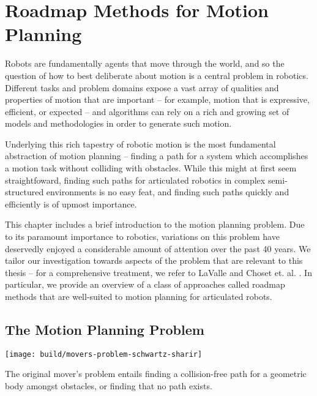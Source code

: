\chapter{Roadmap Methods for Motion Planning}
\label{chap:roadmaps}

Robots are fundamentally agents that move through the world,
and so the question of how to best deliberate about motion
is a central problem in robotics.
Different tasks and problem domains expose a vast array of
qualities and properties of motion that are important
-- for example, motion that is expressive, efficient, or expected
-- and algorithms can rely on a rich and growing set
of models and methodologies in order to generate such motion.

Underlying this rich tapestry of robotic motion
is the most fundamental abstraction of motion planning --
finding a path for a system which accomplishes a motion task
without colliding with obstacles.
While this might at first seem straightfoward,
finding such paths for articulated robotics in
complex semi-structured environments
is no easy feat,
and finding such paths quickly and efficiently
is of upmost importance.

This chapter includes a brief introduction to
the motion planning problem.
Due to its paramount importance to robotics,
variations on this problem have deservedly
enjoyed a considerable amount of attention over the past 40 years.
We tailor our investigation towards aspects of the problem
that are relevant to this thesis
-- for a comprehensive treatment,
we refer to LaValle \citep{lavalle2006planningbook}
and Choset et. al. \citep{choset2005robotmotion}.
In particular,
we provide an overview of a class of approaches called roadmap methods
that are well-suited to motion planning for articulated robots.

\section{The Motion Planning Problem}

\begin{marginfigure}
   \centering
   \texttt{[image: build/movers-problem-schwartz-sharir]} %
   \caption[The original mover's problem
      entails finding a collision-free path for a geometric body
      amongst obstacles,
      or finding that no path exists.
   ]{The original mover's problem
      \citep{schwartzsharir1983pianomovers1}
      entails finding a collision-free path for a geometric body
      amongst obstacles,
      or finding that no path exists.}
   \label{fig:roadmaps:movers}
\end{marginfigure}


